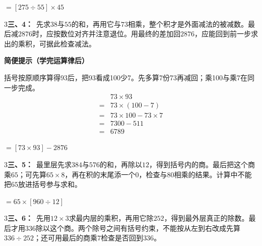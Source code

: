 \documentclass[multi=snippet,border={5bp 20bp 5bp 5bp}]{standalone}
\newenvironment{snippet}[3]{\begin{minipage}{#1bp}\color{answerred}\fontsize{#2}{#3}\selectfont\raggedright}{\end{minipage}}
\begin{document}
\begin{snippet}{87.0875946044922}{10}{12.8}\SourceSans\setlength{\mathindent}{2bp}\(\displaystyle=[275\div55]\times45\)\end{snippet}
\begin{snippet}{505}{11.5}{14}\begin{multicols}{3}\raggedcolumns \textbf{三、4：}\ 先求\(38\)\allowbreak 与\(55\)\allowbreak 的和，再用它与\(73\)\allowbreak 相乘，整个积才是外面减法的被减数。最后减\(2876\)\allowbreak 时，应按数位对齐并注意退位。用最终的差加回\(2876\)\allowbreak ，应能回到前一步求出的乘积，可据此检查减法。\par\textbf{简便提示（学完运算律后）}\par 括号按原顺序算得93后，把93看成100少7。先多算7份73再减回；乘100与乘7在同一步完成。\[\begin{aligned}&73\times93\\={}&73\times(100-7)\\={}&73\times100-73\times7\\={}&7300-511\\={}&6789\end{aligned}\]\end{multicols}\end{snippet}
\begin{snippet}{84.3201843261719}{10}{12.8}\SourceSans\setlength{\mathindent}{2bp}\(\displaystyle=[73\times93]-2876\)\end{snippet}
\begin{snippet}{505}{11.5}{14}\begin{multicols}{3}\raggedcolumns \textbf{三、5：}\ 最里层先求\(384\)\allowbreak 与\(576\)\allowbreak 的和，再除以\(12\)\allowbreak ，得到括号内的商。最后把这个商乘\(65\)\allowbreak ；可先算\(65\times8\)\allowbreak ，再在积的末尾添一个\(0\)\allowbreak ，检查与\(80\)\allowbreak 相乘的结果。计算中不能把\(65\)\allowbreak 放进括号参与求和。\end{multicols}\end{snippet}
\begin{snippet}{87.07808837890626}{10}{12.8}\SourceSans\setlength{\mathindent}{2bp}\(\displaystyle=65\times[960\div12]\)\end{snippet}
\begin{snippet}{505}{11.5}{14}\begin{multicols}{3}\raggedcolumns \textbf{三、6：}\ 先用\(12\times3\)\allowbreak 求最内层的乘积，再用它除\(252\)\allowbreak ，得到最外层真正的除数。最后才用\(336\)\allowbreak 除以这个商。两个除号之间有括号约束，不能按从左到右改成先算\(336\div252\)\allowbreak ；还可用最后的商乘\(7\)\allowbreak 检查是否回到\(336\)\allowbreak 。\end{multicols}\end{snippet}
\end{document}
